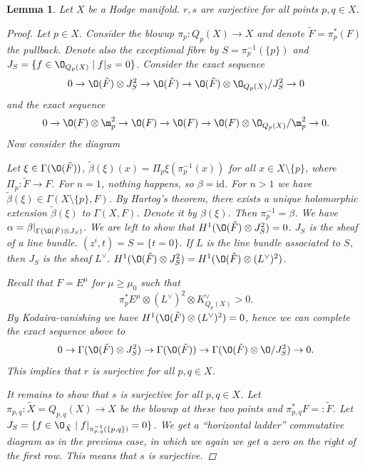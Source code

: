 \documentclass[A4paper, british]{amsart}
\theoremstyle{darkgreentheorem}
\newtheorem{lm}[thm]{Lemma}
\theoremstyle{darkbluedefinition}
\theoremstyle{darkredexample}
\theoremstyle{remark}
\newcommand{\1}{\mathbbm{1}}
\newcommand{\ot}{\otimes}
\newcommand{\id}{\mathrm{id}}
\newcommand{\dual}{^{\vee}}
\begin{document}
\begin{lm}
    Let $X$ be a Hodge manifold.
    $r,s$ are surjective for all points $p,q\in X$.
    \begin{proof}
	Let $p\in X$.
	Consider the blowup $\pi_{p}\colon Q_{p}(X)\to X$ and denote $\tilde{F}=\pi_{p}^{*}(F)$ the pullback.
	Denote also the exceptional fibre by $S=\pi_{p}^{-1}(\{p\})$ and $J_{S}=\{f\in \O_{Q_{p}(X)}\mid f|_{S}=0\}$.
	Consider the exact sequence
	\[ 0\to \O(\tilde{F})\ot J_{S}^{2}\to \O(\tilde{F})\to \O(\tilde{F})\ot \O_{Q_{p}(X)}/J_{S}^{2}\to 0 \]
	and the exact sequence
	\[ 0\to \O(F)\ot \m_{p}^{2}\to \O(F)\to \O(F)\to \O(F)\ot \O_{Q_{p}(X)}/\m_{p}^{2}\to 0. \]
	Now consider the diagram
	\begin{center}
	\end{center}
	Let $\xi\in \Gamma(\O(\tilde{F}))$, $\tilde{\beta}(\xi)(x)=\Pi_{p}\xi(\pi_{p}^{-1}(x))$ for all $x\in X\setminus \{p\}$, where $\Pi_{p}\colon \tilde{F}\to F$.
	For $n=1$, nothing happens, so $\beta=\id$.
	For $n>1$ we have $\tilde{\beta}(\xi)\in \Gamma(X\setminus \{p\},F)$.
	By Hartog's theorem, there exists a unique holomorphic extension $\tilde{\beta}(\xi)$ to $\Gamma(X,F)$.
	Denote it by $\beta(\xi)$.
	Then $\pi_{p}^{-1}=\beta$.
	We have $\alpha=\beta|_{\Gamma(\O(\tilde{F})\ot J_{S})}$.
	We are left to show that $H^{1}(\O(\tilde{F})\ot J_{S}^{2})=0$.
	$J_{S}$ is the sheaf of a line bundle.
	$(z^{i},t)=S=\{t=0\}$.
	If $L$ is the line bundle associated to $S$, then $J_{S}$ is the sheaf $L\dual$.
	$H^{1}(\O(\tilde{F})\ot J_{S}^{2})=H^{1}(\O(\tilde{F})\ot (L\dual)^{2})$.

	Recall that $F=E^{\mu}$ for $\mu\geqslant \mu_{0}$ such that
	\[ \pi_{p}^{*}E^{\mu}\ot (L\dual)^{2}\ot K_{Q_{p}(X)}\dual >0.\]
	By Kodaira-vanishing we have $H^{1}(\O(\tilde{F})\ot (L\dual)^{2})=0$, hence we can complete the exact sequence above to
	\[ 0\to \Gamma(\O(\tilde{F})\ot J_{S}^{2})\to \Gamma(\O(\tilde{F}))\to \Gamma(\O(\tilde{F})\ot \O/J_{S}^{2}) \to 0.\]
	This implies that $r$ is surjective for all $p,q\in X$.
	
	It remains to show that $s$ is surjective for all $p,q\in X$.
	Let $\pi_{p,q}\colon \tilde{X}=Q_{p,q}(X)\to X$ be the blowup at these two points and $\pi_{p,q}^{*}F=:\tilde{F}$.
	Let $J_{S}=\{f\in \O_{\tilde{X}}\mid f|_{\pi_{p,q}^{-1}(\{p,q\})}=0 \}$.
	We get a ``horizontal ladder'' commutative diagram as in the previous case, in which we again we get a zero on the right of the first row.
	This means that $s$ is surjective.
    \end{proof}
\end{lm}
\end{document}

